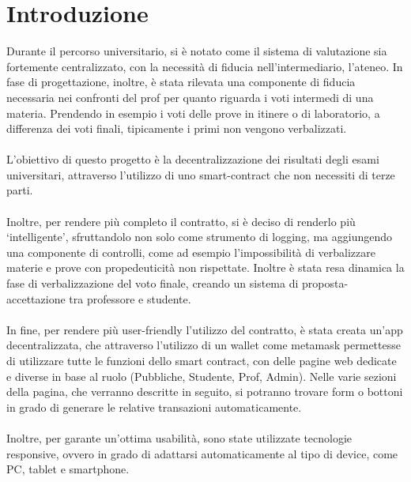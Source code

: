 \section{Introduzione}
Durante il percorso universitario, si è notato come il sistema di valutazione sia fortemente centralizzato, con la necessità di fiducia nell'intermediario, l'ateneo.
In fase di progettazione, inoltre, è stata rilevata una componente di fiducia necessaria nei confronti del prof per quanto riguarda i voti intermedi di una materia.
Prendendo in esempio i voti delle prove in itinere o di laboratorio, a differenza dei voti finali, tipicamente i primi non vengono verbalizzati.\\
\\
L'obiettivo di questo progetto è la decentralizzazione dei risultati degli esami universitari, attraverso l'utilizzo di uno \gls{smart-contract} che non necessiti di terze parti.\\
\\
Inoltre, per rendere più completo il contratto, si è deciso di renderlo più `intelligente', sfruttandolo non solo come strumento di logging, ma aggiungendo una componente di controlli, come ad esempio l'impossibilità di verbalizzare materie e prove con propedeuticità non rispettate. Inoltre è stata resa dinamica la fase di verbalizzazione del voto finale, creando un sistema di proposta-accettazione tra professore e studente. \\
\\
In fine, per rendere più user-friendly l'utilizzo del contratto, è stata creata un'app decentralizzata, che attraverso l'utilizzo di un wallet come \gls{metamask} permettesse di utilizzare tutte le funzioni dello smart contract, con delle pagine web dedicate e diverse in base al ruolo (Pubbliche, Studente, Prof, Admin). Nelle varie sezioni della pagina, che verranno descritte in seguito, si potranno trovare form o bottoni in grado di generare le relative transazioni automaticamente.\\
\\
Inoltre, per garante un'ottima usabilità, sono state utilizzate tecnologie responsive, ovvero in grado di adattarsi automaticamente al tipo di device, come PC, tablet e smartphone.\\